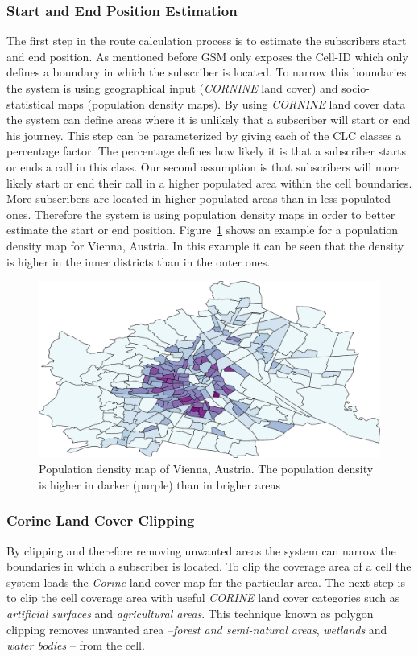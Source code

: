 \documentclass[master,english]{hgbthesis}
\begin{document}
\subsubsection{Start and End Position Estimation}
\label{sec:startandend}
The first step in the route calculation process is to estimate the subscribers start and end position. As mentioned before GSM only exposes the Cell-ID which only defines a boundary in which the subscriber is located. To narrow this boundaries the system is using geographical input (\emph{CORNINE} land cover) and socio-statistical maps (population density maps).
By using \emph{CORNINE} land cover data the system can define areas where it is unlikely that a subscriber will start or end his journey. This step can be parameterized by giving each of the CLC classes a percentage factor. The percentage defines how likely it is that a subscriber starts or ends a call in this class.
Our second assumption is that subscribers will more likely start or end their call in a higher populated area within the cell boundaries. More subscribers are located in higher populated areas than in less populated ones. Therefore the system is using population density maps in order to better estimate the start or end position. Figure~\ref{fig:pop_vienna} shows an example for a population density map for Vienna, Austria. In this example it can be seen that the density is higher in the inner districts than in the outer ones.
\begin{figure}
	\centering
	\includegraphics[width=0.7\linewidth]{./images/pop_vienna}
	\caption{Population density map of Vienna, Austria. The population density is higher in darker (purple) than in brigher areas}
	\label{fig:pop_vienna}
\end{figure}
\subsubsection{Corine Land Cover Clipping}
By clipping and therefore removing unwanted areas the system can narrow the boundaries in which a subscriber is located. To clip the coverage area of a cell the system loads the \emph{Corine} land cover map for the particular area. The next step is to clip the cell coverage area with useful \emph{CORINE} land cover categories such as \emph{artificial surfaces} and \emph{agricultural areas}. This technique known as polygon clipping removes unwanted area --\emph{forest and semi-natural areas}, \emph{wetlands} and \emph{water bodies} -- from the cell.
\end{document}
